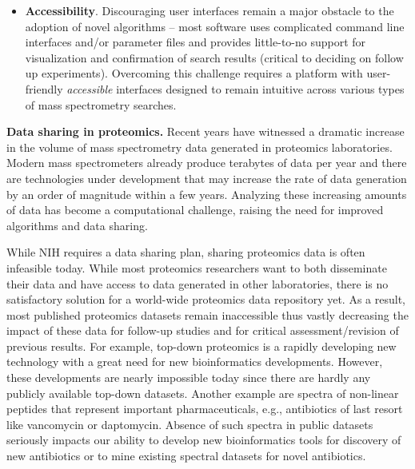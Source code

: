 \documentclass[arial,11pt]{article}
\begin{document}
\begin{itemize}
  \item {\bf Accessibility}. Discouraging user interfaces remain a major obstacle to the adoption of novel algorithms -- most software uses complicated command line interfaces and/or parameter files and provides little-to-no support for visualization and confirmation of search results (critical to deciding on follow up experiments). Overcoming this challenge requires a platform with user-friendly {\em accessible} interfaces designed to remain intuitive across various types of mass spectrometry searches.

\end{itemize}

{\bf Data sharing in proteomics.} Recent years have witnessed a dramatic increase in the volume of mass spectrometry data generated in proteomics laboratories. Modern mass spectrometers already produce terabytes of data per year and there are technologies under development that may increase the rate of data generation by an order of magnitude within a few years. Analyzing these increasing amounts of data has become a computational challenge, raising the need for improved algorithms and data sharing.

While NIH requires a data sharing plan, sharing proteomics data is often infeasible today. While most proteomics researchers want to both disseminate their data and have access to data generated in other laboratories, there is no satisfactory solution for a world-wide proteomics data repository yet. As a result, most published proteomics datasets remain inaccessible thus vastly decreasing the impact of these data for follow-up studies and for critical assessment/revision of previous results.  For example, top-down proteomics is a rapidly developing new technology with a great need for new bioinformatics developments.  However, these developments are nearly impossible today since there are hardly any publicly available top-down datasets.  Another example are spectra of non-linear peptides that represent important pharmaceuticals, e.g., antibiotics of last resort like vancomycin or daptomycin.  Absence of such spectra in public datasets seriously impacts our ability to develop new bioinformatics tools for discovery of new antibiotics or to mine existing spectral datasets for novel antibiotics.
\end{document}
